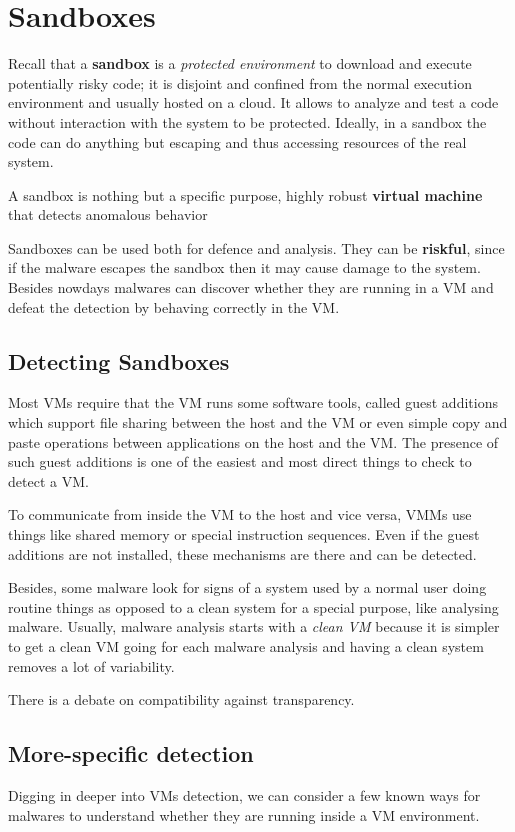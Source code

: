 \section{Sandboxes}
Recall that a \textbf{sandbox} is a \textit{protected environment} to download and execute potentially risky code;
it is disjoint and confined from the normal execution environment and usually hosted
on a cloud.
It allows to analyze and test a code without
interaction with the system to be protected.
Ideally, in a sandbox the code can do anything but escaping and thus accessing resources of the real system.

A sandbox is nothing but a specific purpose, highly robust \textbf{virtual machine}
that detects anomalous behavior 

Sandboxes can be used both for defence and analysis.
They can be \textbf{riskful}, 
since if the malware escapes the sandbox then it may cause damage to the system.
Besides nowdays malwares can discover whether they are running in a VM and defeat the detection by behaving correctly in the VM.

\subsection{Detecting Sandboxes}
Most VMs require that the VM runs some software tools, called guest
additions which support file sharing between the host and the VM or even simple
copy and paste operations between applications on the host and the VM.
The presence of such  guest additions is one of the easiest and most direct things to
check to detect a VM.

To communicate from inside the VM to the host and vice versa, VMMs use
things like shared memory or special instruction sequences.
Even if the guest
additions are not installed, these mechanisms are there and can be detected.

Besides, some malware look for signs of a system used by a normal user doing routine
things as opposed to a clean system for a special purpose, like analysing
malware.
Usually, malware analysis starts with a \textit{clean VM} because it is simpler
to get a clean VM going for each malware analysis and having a clean system
removes a lot of variability.

There is a debate on compatibility against transparency.

\subsection{More-specific detection}
Digging in deeper into VMs detection, we can consider a few known ways for malwares to understand whether they are running inside a VM environment.

